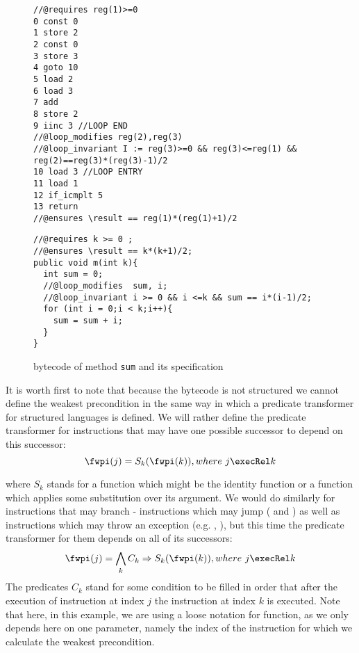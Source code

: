   
\begin{figure}[ht!]
\begin{center}
\begin{minipage}[c]{\linewidth} 
\begin{minipage}[c]{\linewidth}
\scriptsize{
\begin{lstlisting}[frame=trbl]
//@requires reg(1)>=0
0 const 0
1 store 2
2 const 0
3 store 3
4 goto 10
5 load 2
6 load 3
7 add
8 store 2
9 iinc 3 //LOOP END
//@loop_modifies reg(2),reg(3)
//@loop_invariant I := reg(3)>=0 && reg(3)<=reg(1) && reg(2)==reg(3)*(reg(3)-1)/2
10 load 3 //LOOP ENTRY 
11 load 1
12 if_icmplt 5 
13 return
//@ensures \result == reg(1)*(reg(1)+1)/2
\end{lstlisting}} 
\end{minipage}


\begin{minipage}[c]{\linewidth} 
\scriptsize{
\begin{lstlisting}[frame=trbl]
//@requires k >= 0 ;
//@ensures \result == k*(k+1)/2;
public void m(int k){
  int sum = 0;
  //@loop_modifies  sum, i;
  //@loop_invariant i >= 0 && i <=k && sum == i*(i-1)/2;
  for (int i = 0;i < k;i++){
    sum = sum + i;
  } 
}
\end{lstlisting} }
\end{minipage}
\end{minipage}
\end{center}
\caption{\sc  bytecode of method \lstinline!sum! and its specification }
\label{wp:example:sum}
\end{figure}


 It is worth first to note that because the bytecode is not structured we cannot define
 the weakest precondition in the same way in which a predicate transformer for structured
 languages is defined.  
 We will rather  define the predicate transformer for  instructions that may have one possible successor to depend on
 this successor:
$$\fwpi( j ) =  S_k(\fwpi( k )) , where  \ j \execRel k $$

where $S_k$ stands for a function which might be the identity function or a function which applies some substitution over its argument.
 We would do similarly for instructions that may branch - instructions which may jump (\goto{} and \ifCond{}) as well as instructions
 which may throw an exception (e.g. \putfield, \arrstore), but this time the predicate transformer for them depends on all of its successors:
$$\fwpi( j ) = \bigwedge_k  C_k \Rightarrow S_k(\fwpi( k )) , where  \ j \execRel k $$
The predicates $C_k$ stand for some condition to be filled in order that after the execution of instruction at index $j$ the instruction at index $k$ is executed.
Note that here, in this example, we are using a loose notation for \wpName{}  function, as we only depends here on one parameter, namely the index
of the instruction for which we calculate the weakest precondition.

